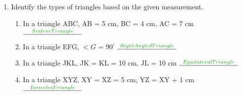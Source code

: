 \documentclass[../main.tex]{subfiles}
\begin{document}
\begin{enumerate}
\begin{minipage}{0.3\textwidth}
	\end{minipage}
		\item Identify the types of triangles based on the given measurement.
        \begin{enumerate}[label=\roman*., leftmargin=*]
            \item In a triangle ABC, AB = 5 cm, BC = 4 cm, AC = 7 cm $\ans{3cm}{Scalene Triangle}$
            \item In a triangle EFG, $<G$ = $90^\circ$ $\ans{3cm}{Right Angled Triangle}$
            \item In a triangle JKL, JK = KL = 10 cm, JL = 10 cm $\ans{3cm}{Equilateral Triangle}$
            \item In a triangle XYZ, XY = XZ = 5 cm, YZ = XY + 1 cm $\ans{3cm}{Isosceles Triangle}$
        \end{enumerate}
	\end{enumerate}
\end{document}
